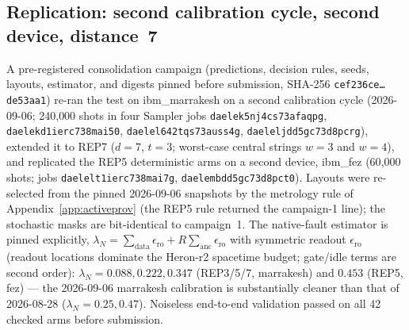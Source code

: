 \documentclass[11pt,a4paper]{article}
\begin{document}
\subsection{Replication: second calibration cycle, second device,
distance~7}\label{app:injection-repl}

A pre-registered consolidation campaign (predictions, decision rules,
seeds, layouts, estimator, and digests pinned before submission, SHA-256
\texttt{cef236ce\dots de53aa1}) re-ran the test on
ibm\_marrakesh on a second calibration cycle (2026-09-06; 240{,}000
shots in four Sampler jobs \texttt{daelek5nj4cs73afaqpg},
\texttt{daelekd1ierc738mai50}, \texttt{daelel642tqs73auss4g},
\texttt{daeleljdd5gc73d8pcrg}), extended it to REP7 ($d{=}7$, $t{=}3$;
worst-case central strings $w{=}3$ and $w{=}4$), and replicated the REP5
deterministic arms on a second device, ibm\_fez (60{,}000 shots; jobs
\texttt{daelelt1ierc738mai7g}, \texttt{daelembdd5gc73d8pct0}). Layouts
were re-selected from the pinned 2026-09-06 snapshots by the
metrology rule of Appendix~\ref{app:activeprov} (the REP5 rule returned
the campaign-1 line); the stochastic masks are bit-identical to
campaign~1. The native-fault estimator is pinned explicitly,
$\lambda_N=\sum_{\mathrm{data}}\epsilon_{\mathrm{ro}}+
R\sum_{\mathrm{anc}}\epsilon_{\mathrm{ro}}$ with symmetric readout
$\epsilon_{\mathrm{ro}}$ (readout locations dominate the Heron-r2
spacetime budget; gate/idle terms are second order): $\lambda_N{=}0.088,
0.222, 0.347$ (REP3/5/7, marrakesh) and $0.453$ (REP5, fez) --- the
2026-09-06 marrakesh calibration is substantially cleaner than that of
2026-08-28 ($\lambda_N{=}0.25, 0.47$). Noiseless end-to-end validation
passed on all 42 checked arms before submission.
\end{document}
